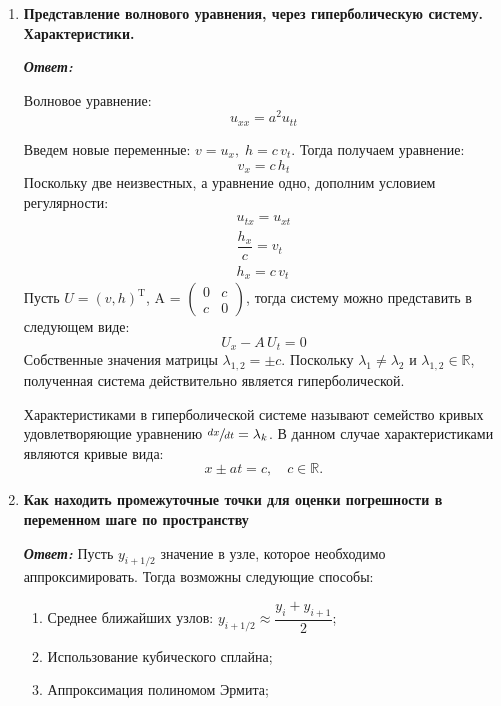 \documentclass[12pt, a4paper]{article}
\begin{document}
	\begin{enumerate}
		\item \textbf{Представление волнового уравнения, через гиперболическую систему. Характеристики.}
		\vspace*{0.2cm}
		
		\textit{\textbf{Ответ:}}
		
			Волновое уравнение:
			\[
			u_{xx} = a^2 u_{tt}
			\]
			
			Введем новые переменные: $v = u_x, \; h = c \, v_t$. Тогда получаем уравнение:
			\[
			v_{x} = c \, h_{t}
			\]
			Поскольку две неизвестных, а уравнение одно, дополним условием регулярности:
			\begin{gather*}
				u_{tx} = u_{xt} \\
				\dfrac{h_x}{c} = v_t \\
				h_x = c \, v_t
			\end{gather*}
			Пусть $U = (v, h)^{\text{T}}$, A = $ \left( \begin{smallmatrix} 0 & c \\ c & 0 \end{smallmatrix} \right)$, тогда систему можно представить в следующем виде:
			\[
			U_x - A \, U_t = 0
			\]
			Собственные значения матрицы $\lambda_{1, 2} = \pm c$. Поскольку $\lambda_1 \ne \lambda_2$ и $\lambda_{1, 2} \in \mathbb{R}$, полученная система действительно является гиперболической.
			
			
			Характеристиками в гиперболической системе называют семейство кривых удовлетворяющие уравнению  $\sfrac{d x}{d t} = \lambda_{k}$. В данном случае характеристиками являются кривые вида:
			\[
			x \pm a t = c, \quad c \in \mathbb{R}.
			\]
			
			
		\item \textbf{Как находить промежуточные точки для оценки погрешности в переменном шаге по пространству}
		\vspace*{0.2cm}
		
		\textit{\textbf{Ответ:}}
			Пусть $y_{i+1/2}$ значение в узле, которое необходимо аппроксимировать. Тогда возможны следующие способы:
		\begin{enumerate}
			\item Среднее ближайших узлов: $y_{i+1/2} \approx \dfrac{y_{i} + y_{i+1}}{2}$;
			\item Использование кубического сплайна;
			\item Аппроксимация полиномом Эрмита;
		\end{enumerate}

	\end{enumerate}
	
\end{document}
